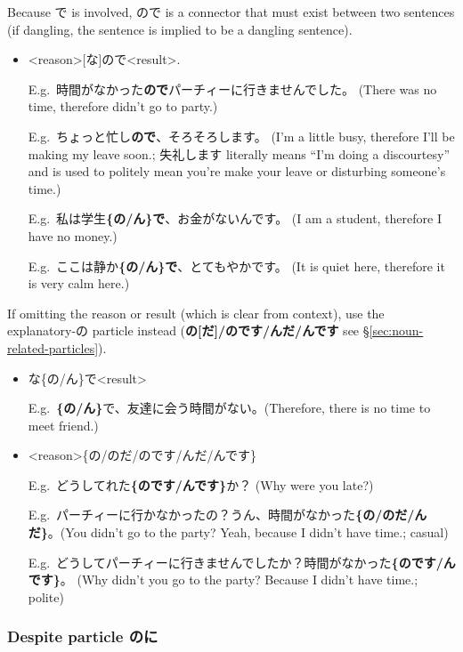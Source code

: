 \documentclass[../nihongo-gakushuu-kyouzai.tex]{subfiles}
\begin{document}
\begin{itemize}
    Because で is involved, ので is a connector that must exist between two sentences (if dangling, the sentence is implied to be a dangling sentence).
    \begin{itemize}
        \item <reason>[な]ので<result>.


        E.g.\ 時間がなかった\textbf{ので}パーチィーに行きませんでした。 (There was no time, therefore didn't go to party.)

        E.g.\ ちょっと忙し\textbf{ので}、そろそろします。 (I'm a little busy, therefore I'll be making my leave soon.; 失礼します literally means ``I'm doing a discourtesy'' and is used to politely mean you're make your leave or disturbing someone's time.)

        E.g.\ 私は学生\textbf{\{の/ん\}で}、お金がないんです。 (I am a student, therefore I have no money.)

        E.g.\ ここは静か\textbf{\{の/ん\}で}、とてもやかです。 (It is quiet here, therefore it is very calm here.)
    \end{itemize}

    If omitting the reason or result (which is clear from context), use the explanatory-の particle instead (\textbf{の[だ]/のです/んだ/んです} see \S\ref{sec:noun-related-particles}).

    \begin{itemize}
        \item な\{の/ん\}で<result>


        E.g.\ \textbf{\{の/ん\}}で、友達に会う時間がない。(Therefore, there is no time to meet friend.)

        \item <reason>\{の/のだ/のです/んだ/んです\}

        E.g.\ どうしてれた\textbf{\{のです/んです\}}か？ (Why were you late?)

        E.g.\ パーチィーに行かなかったの？うん、時間がなかった\textbf{\{の/のだ/んだ\}}。(You didn't go to the party? Yeah, because I didn't have time.; casual)

        E.g.\ どうしてパーチィーに行きませんでしたか？時間がなかった\textbf{\{のです/んです\}}。 (Why didn't you go to the party? Because I didn't have time.; polite)
    \end{itemize}

\end{itemize}

\subsubsection{Despite particle のに}
\end{document}
